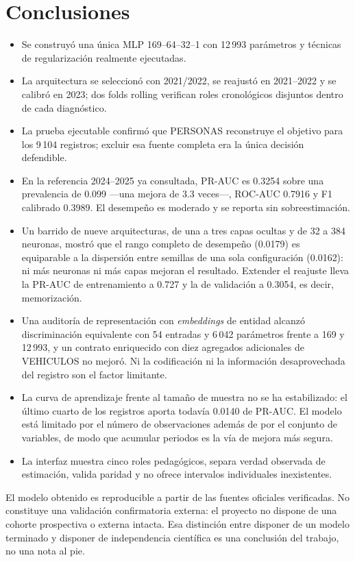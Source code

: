 \section{Conclusiones}\label{sec:conclusiones}

\begin{itemize}
\item Se construyó una única MLP 169--64--32--1 con 12\,993 parámetros y técnicas de regularización realmente ejecutadas.
\item La arquitectura se seleccionó con 2021/2022, se reajustó en 2021--2022 y se calibró en 2023; dos folds rolling verifican roles cronológicos disjuntos dentro de cada diagnóstico.
\item La prueba ejecutable confirmó que PERSONAS reconstruye el objetivo para los 9\,104 registros; excluir esa fuente completa era la única decisión defendible.
\item En la referencia 2024--2025 ya consultada, PR-AUC es 0.3254 sobre una prevalencia de 0.099 ---una mejora de 3.3 veces---, ROC-AUC 0.7916 y F1 calibrado 0.3989. El desempeño es moderado y se reporta sin sobreestimación.
\item Un barrido de nueve arquitecturas, de una a tres capas ocultas y de 32 a 384 neuronas, mostró que el rango completo de desempeño (0.0179) es equiparable a la dispersión entre semillas de una sola configuración (0.0162): ni más neuronas ni más capas mejoran el resultado. Extender el reajuste lleva la PR-AUC de entrenamiento a 0.727 y la de validación a 0.3054, es decir, memorización.
\item Una auditoría de representación con \emph{embeddings} de entidad alcanzó discriminación equivalente con 54 entradas y 6\,042 parámetros frente a 169 y 12\,993, y un contrato enriquecido con diez agregados adicionales de VEHICULOS no mejoró. Ni la codificación ni la información desaprovechada del registro son el factor limitante.
\item La curva de aprendizaje frente al tamaño de muestra no se ha estabilizado: el último cuarto de los registros aporta todavía 0.0140 de PR-AUC. El modelo está limitado por el número de observaciones además de por el conjunto de variables, de modo que acumular periodos es la vía de mejora más segura.
\item La interfaz muestra cinco roles pedagógicos, separa verdad observada de estimación, valida paridad y no ofrece intervalos individuales inexistentes.
\end{itemize}

El modelo obtenido es reproducible a partir de las fuentes oficiales verificadas. No constituye una validación confirmatoria externa: el proyecto no dispone de una cohorte prospectiva o externa intacta. Esa distinción entre disponer de un modelo terminado y disponer de independencia científica es una conclusión del trabajo, no una nota al pie.
